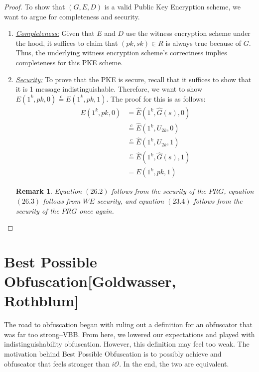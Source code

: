 \documentclass{article}
\newtheorem{remark}[corollary]{Remark}
\newcommand{\ci}{\stackrel{c}{=}}
\newcommand{\io}{i\mathcal{O}}
\begin{document}
\begin{proof}
    To show that $(G, E, D)$ is a valid Public Key Encryption scheme, we want to argue for completeness and security.
    \begin{enumerate}
        \item \underline{\textit{Completeness:}} Given that $E$ and $D$ use the witness encryption scheme under the hood, it suffices to claim that $(pk, sk) \in R$ is always true because of $G$. Thus, the underlying witness encryption scheme's correctness implies completeness for this PKE scheme.

        \item \underline{\textit{Security:}} To prove that the PKE is secure, recall that it suffices to show that it is 1 message indistinguishable. Therefore, we want to show $E(1^k, pk, 0) \ci E(1^k, pk, 1)$. The proof for this is as follows:
            \begin{align}
                E(1^k, pk, 0) &= \hat{E}(1^k, \hat{G}(s), 0) \\
                &\ci \hat{E}(1^k, U_{2k}, 0) \\
                &\ci \hat{E}(1^k, U_{2k}, 1) \\
                &\ci \hat{E}(1^k, \hat{G}(s), 1) \\
                &= E(1^k, pk, 1)
            \end{align}
        \begin{remark}
        Equation $(26.2)$ follows from the security of the $PRG$, equation $(26.3)$ follows from $WE$ security, and equation $(23.4)$ follows from the security of the $PRG$ once again.
        \end{remark}
    \end{enumerate}
\end{proof}
\section{Best Possible Obfuscation[Goldwasser, Rothblum]}
The road to obfuscation began with ruling out a definition for an obfuscator that was far too strong–VBB. From here, we lowered our expectations and played with indistinguishability obfuscation. However, this definition may feel too weak. The motivation behind Best Possible Obfuscation is to possibly achieve and obfuscator that feels stronger than $\io$. In the end, the two are equivalent.
\end{document}
